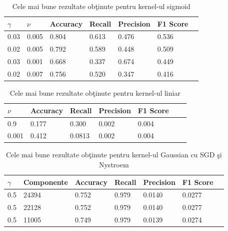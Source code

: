 \begin{table}[H]
    \centering
    \begin{tabularx}{\textwidth}{
        |X
        |X
        |X
        |X
        |X
        |X
        |X|
    }
    \hline
    $\gamma$ & $\nu$ & {Accuracy} & {Recall} & {Precision} & {F1 Score} \\
    \hline
    \rowcolor{gray!20} 0.03	& 0.005	& 0.804 & 0.613	& 0.476 & 0.536\\
    0.02 & 0.005 & 0.792 & 0.589 & 0.448 & 0.509 \\
    \rowcolor{gray!20} 0.03	& 0.001	& 0.668 & 0.337	& 0.674 & 0.449    \\
    0.02 & 0.007 & 0.756 & 0.520 & 0.347 & 0.416 \\
    \hline
  \end{tabularx}
  \caption{Cele mai bune rezultate obţinute pentru kernel-ul sigmoid}
\end{table}

\begin{table}[H]
    \centering
    \begin{tabularx}{\textwidth}{
        |X
        |X
        |X
        |X
        |X
        |X
        |X|
    }
    \hline
    $\nu$ & {Accuracy} & {Recall} & {Precision} & {F1 Score} \\
    \hline
    \rowcolor{gray!20} 0.9 & 0.177 & 0.300 & 0.002 & 0.004    \\
    0.001 & 0.412	& 0.0813	& 0.002	& 0.004 \\
    \hline
  \end{tabularx}
  \caption{Cele mai bune rezultate obţinute pentru kernel-ul liniar}
\end{table}

\begin{table}[H]
    \centering
    \begin{tabularx}{\textwidth}{
        |X
        |X
        |X
        |X
        |X
        |X
        |X|
    }
    \hline
    $\gamma$ & {Componente} & {Accuracy} & {Recall} & {Precision} & {F1 Score} \\
    \hline
     0.5 & 24394 & 0.752 & 0.979 & 0.0140	& 0.0277 \\
    \rowcolor{gray!20} 0.5	& 22128	& 0.752 & 0.979	& 0.0140 & 0.0277 \\
    0.5	& 11005	& 0.749	& 0.979	& 0.0139 & 0.0274 \\
    \hline
  \end{tabularx}
  \caption{Cele mai bune rezultate obţinute pentru kernel-ul Gaussian cu SGD şi Nystroem}
\end{table}

